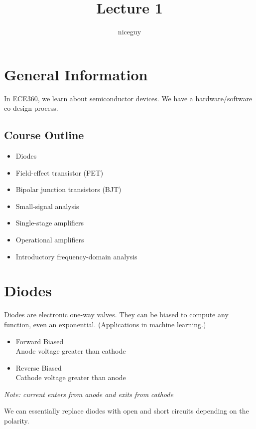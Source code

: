 \documentclass[12pt]{article}
\title{Lecture 1}
\author{niceguy}
\begin{document}
\maketitle

\section{General Information}

In ECE360, we learn about semiconductor devices. We have a hardware/software co-design process.

\subsection{Course Outline}

\begin{itemize}
    \item Diodes
    \item Field-effect transistor (FET)
    \item Bipolar junction transistors (BJT)
    \item Small-signal analysis
    \item Single-stage amplifiers
    \item Operational amplifiers
    \item Introductory frequency-domain analysis
\end{itemize}

\section{Diodes}

Diodes are electronic one-way valves. They can be biased to compute any function, even an exponential. (Applications in machine learning.)

\begin{itemize}
    \item Forward Biased \\
        Anode voltage greater than cathode
    \item Reverse Biased \\
        Cathode voltage greater than anode
\end{itemize}

\textit{Note: current enters from anode and exits from cathode}

We can essentially replace diodes with open and short circuits depending on the polarity.
\end{document}
